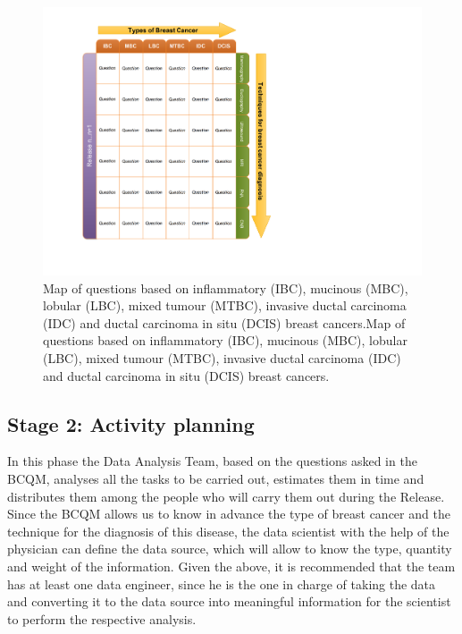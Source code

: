 \begin{figure}[H]
	\centering
	\includegraphics[width=1
	\linewidth]{IMAGES/BCQM.pdf}
	\caption{Map of questions based on inflammatory (IBC), mucinous (MBC), lobular (LBC), mixed tumour (MTBC), invasive ductal carcinoma (IDC) and ductal carcinoma in situ (DCIS) breast cancers.Map of questions based on inflammatory (IBC), mucinous (MBC), lobular (LBC), mixed tumour (MTBC), invasive ductal carcinoma (IDC) and ductal carcinoma in situ (DCIS) breast cancers.}
	\label{BCQM}
\end{figure}

\subsection*{Stage 2: Activity planning }
In this phase the Data Analysis Team, based on the questions asked in the BCQM, analyses all the tasks to be carried out, estimates them in time and distributes them among the people who will carry them out during the Release. Since the BCQM allows us to know in advance the type of breast cancer and the technique for the diagnosis of this disease, the data scientist with the help of the physician can define the data source, which will allow to know the type, quantity and weight of the information. Given the above, it is recommended that the team has at least one data engineer, since he is the one in charge of taking the data and converting it to the data source into meaningful information for the scientist to perform the respective analysis. 

